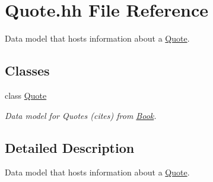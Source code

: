 \hypertarget{_quote_8hh}{}\section{Quote.\+hh File Reference}
\label{_quote_8hh}


Data model that hosts information about a \hyperlink{class_quote}{Quote}.  


\subsection*{Classes}
\begin{DoxyCompactItemize}
\item 
class \hyperlink{class_quote}{Quote}
\begin{DoxyCompactList}\small\item\em Data model for Quotes (cites) from \hyperlink{class_book}{Book}. \end{DoxyCompactList}\end{DoxyCompactItemize}


\subsection{Detailed Description}
Data model that hosts information about a \hyperlink{class_quote}{Quote}. 

